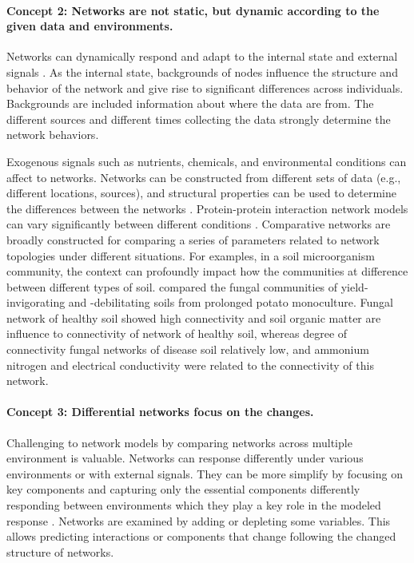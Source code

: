 \paragraph{Concept 2: Networks are not static, but dynamic according to the given data and environments.} Networks can dynamically respond and adapt to the internal state and external signals . As the internal state, backgrounds of nodes influence the structure and behavior of the network and give rise to significant differences across individuals. Backgrounds are included information about where the data are from. The different sources and different times collecting the data strongly determine the network behaviors. 

Exogenous signals such as nutrients, chemicals, and environmental conditions can affect to networks. Networks can be constructed from different sets of data (e.g., different locations, sources), and structural properties can be used to determine the differences between the networks . Protein-protein interaction network models can vary significantly between different conditions . Comparative networks are broadly constructed for comparing a series of parameters related to network topologies under different situations. For examples, in a soil microorganism community, the context can profoundly impact how the communities at difference between different types of soil.  compared the fungal communities of yield-invigorating and -debilitating soils from prolonged potato monoculture. Fungal network of healthy soil showed high connectivity and  soil organic matter are influence to connectivity of network of healthy soil, whereas degree of connectivity fungal networks of disease soil relatively low, and ammonium nitrogen and electrical conductivity were related to the connectivity of this network.

\paragraph{Concept 3: Differential networks focus on the changes.} Challenging to network models by comparing networks across multiple environment is valuable. Networks can response differently under various environments or with external signals. They can be more simplify by focusing on key components and capturing only the essential components differently responding between environments which they play a key role in the modeled response . Networks are examined by adding or depleting some variables. This allows predicting interactions or components that change following the changed structure of networks. 


